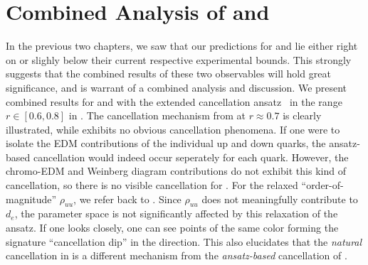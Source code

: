 \chapter{Combined Analysis of {\eedm} and {\nedm}}
\label{ch:combined-eEDM-nEDM}

In the previous two chapters, we saw that our {\gthdm} predictions for {\eedm} and {\nedm} lie either right on or slighly below their current respective experimental bounds.
This strongly suggests that the combined results of these two observables will hold great significance,
and is warrant of a combined analysis and discussion.
We present combined results for {\eedm} and {\nedm} with the extended cancellation ansatz~ in the range \(r \in [0.6, 0.8] \) in .
The {\eedm} cancellation mechanism from  at \(r \approx 0.7 \) is clearly illustrated,
while {\nedm} exhibits no obvious cancellation phenomena.
If one were to isolate the EDM contributions of the individual up and down quarks,
the ansatz-based cancellation would indeed occur seperately for each quark.
However, the chromo-EDM and Weinberg diagram contributions do not exhibit this kind of cancellation,
so there is no visible cancellation for {\nedm}.
For the relaxed ``order-of-magnitude'' \(\rho_{uu} \), we refer back to .
Since \(\rho_{uu} \) does not meaningfully contribute to \(d_{e} \), 
the {\eedm} parameter space is not significantly affected by this relaxation of the ansatz.
If one looks closely, one can see points of the same color forming the signature ``cancellation dip'' in the {\eedm} direction.
This also elucidates that the \emph{natural} cancellation in {\nedm} is a different mechanism from the \emph{ansatz-based} cancellation of {\eedm}.

